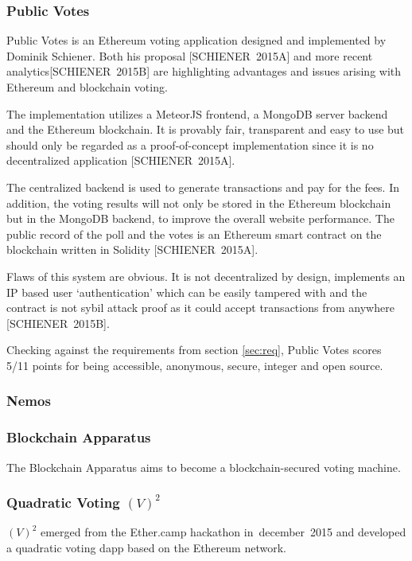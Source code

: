 \documentclass[9pt,oneside]{amsart}
\begin{document}
\begin{multicols}{2}
\subsubsection{Public Votes}
Public Votes is an Ethereum voting application designed and implemented by Dominik Schiener. Both his proposal [SCHIENER~2015A] and more recent analytics[SCHIENER~2015B] are highlighting advantages and issues arising with Ethereum and blockchain voting.\par
The implementation utilizes a MeteorJS frontend, a MongoDB server backend and the Ethereum blockchain. It is provably fair, transparent and easy to use but should only be regarded as a proof-of-concept implementation since it is no decentralized application [SCHIENER~2015A].\par
The centralized backend is used to generate transactions and pay for the fees. In addition, the voting results will not only be stored in the Ethereum blockchain but in the MongoDB backend, to improve the overall website performance. The public record of the poll and the votes is an Ethereum smart contract on the blockchain written in Solidity [SCHIENER~2015A].\par
Flaws of this system are obvious. It is not decentralized by design, implements an IP based user \enquote*{authentication} which can be easily tampered with and the contract is not sybil attack proof as it could accept transactions from anywhere [SCHIENER~2015B].\par
Checking against the requirements from section \ref{sec:req}, Public Votes scores 5/11 points for being accessible, anonymous, secure, integer and open source.

\subsubsection{Nemos}
\subsubsection{Blockchain Apparatus}
The Blockchain Apparatus aims to become a blockchain-secured voting machine.

\subsubsection{Quadratic Voting $(V)^2$}
$(V)^2$ emerged from the Ether.camp hackathon in~december~2015 and developed a quadratic voting dapp based on the Ethereum network.



\end{multicols}
\end{document}
